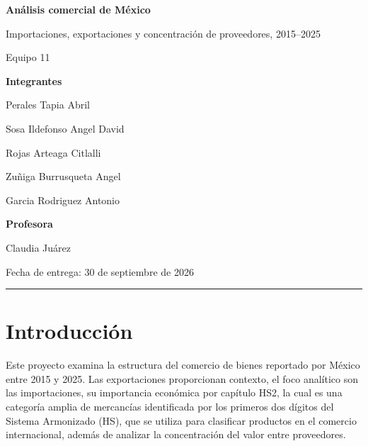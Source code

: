 \documentclass[
  spanish,
  10pt,
]{article}
\author{}
\date{\vspace{-2.5em}30/09/2026}
\begin{document}
\begin{titlepage}
\centering

\vspace*{2cm}

{\LARGE\bfseries Análisis comercial de México\par}

\vspace{0.7cm}

{\large Importaciones, exportaciones y concentración de proveedores, 2015--2025\par}

\vspace{1.5cm}

{\Large Equipo 11\par}

\vspace{0.8cm}

{\large\bfseries Integrantes\par}

\vspace{0.4cm}

Perales Tapia Abril\par
Sosa Ildefonso Angel David\par
Rojas Arteaga Citlalli\par
Zuñiga Burrusqueta Angel\par
Garcia Rodriguez Antonio\par

\vspace{1cm}

{\large\bfseries Profesora\par}
Claudia Juárez\par

\vfill

Fecha de entrega: 30 de septiembre de 2026\par

\end{titlepage}

\tableofcontents
\clearpage

\begin{center}\rule{0.5\linewidth}{0.5pt}\end{center}

\section{Introducción}\label{introducciuxf3n}

Este proyecto examina la estructura del comercio de bienes reportado por
México entre 2015 y 2025. Las exportaciones proporcionan contexto, el
foco analítico son las importaciones, su importancia económica por
capítulo HS2, la cual es una categoría amplia de mercancías identificada
por los primeros dos dígitos del Sistema Armonizado (HS), que se utiliza
para clasificar productos en el comercio internacional, además de
analizar la concentración del valor entre proveedores.
\end{document}
